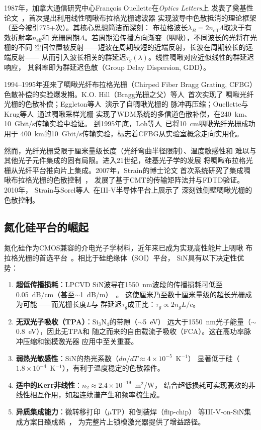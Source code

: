 \documentclass[12pt,a4paper,twoside]{article}
\begin{document}
1987年，加拿大通信研究中心Fran\c{c}ois Ouellette在\textit{Optics Letters}上
发表了奠基性论文~\cite{ouellette1987}，首次提出利用线性啁啾布拉格光栅滤波器
实现波导中色散抵消的理论框架（至今被引775+次）。其核心思想简洁而深刻：
布拉格波长$\lambda_B = 2n_{\text{eff}}\Lambda$取决于有效折射率$n_{\text{eff}}$和
光栅周期$\Lambda$。若周期沿传播方向渐变（啁啾），不同波长的光将在光栅的不同
空间位置被反射——短波在周期较短的近端反射，长波在周期较长的远端反射——
从而引入波长相关的群延迟$\tau_g(\lambda)$。线性啁啾对应近似线性的群延迟响应，
其斜率即为群延迟色散（Group Delay Dispersion, GDD）。

1994--1995年迎来了啁啾光纤布拉格光栅（Chirped Fiber Bragg Grating, CFBG）
色散补偿的实验爆发期。K.O. Hill（Bragg光栅之父）等人~\cite{hill1994}首次实现了
啁啾光纤光栅的色散补偿；Eggleton等人~\cite{eggleton1994}演示了自啁啾光栅的
脉冲再压缩；Ouellette与Krug等人~\cite{ouellette1995}通过啁啾采样光栅
实现了WDM系统的多信道色散补偿，在240~km、10~Gbit/s传输实验中验证。
到1995年底，Loh等人~\cite{loh1995}已将10~cm啁啾光纤光栅成功用于
400~km的10~Gbit/s传输实验，标志着CFBG从实验室概念走向实用化。

然而，光纤光栅受限于厘米量级长度（光纤弯曲半径限制）、温度敏感性和
难以与其他光子元件集成的固有局限。进入21世纪，硅基光子学的发展
将啁啾布拉格光栅从光纤平台推向片上集成。2007年，Strain的博士论文
首次系统研究了集成啁啾布拉格光栅的色散控制~\cite{strain2007}，
发展了基于CMT的传输矩阵法并与FDTD验证。2010年，
Strain与Sorel等人~\cite{strain2010}在III-V半导体平台上展示了
深刻蚀侧壁啁啾光栅的色散控制。

\subsection{氮化硅平台的崛起}

氮化硅作为CMOS兼容的介电光子学材料，近年来已成为实现高性能片上啁啾
布拉格光栅的首选平台~\cite{gardes2022}。相比于硅绝缘体（SOI）平台，
SiN具有以下决定性优势：

\begin{enumerate}[leftmargin=*,itemsep=2pt]
\item \textbf{超低传播损耗}：LPCVD SiN波导在1550~nm波段的传播损耗可低至
  \SI{0.05}{dB/cm}（甚至$\sim$\SI{1}{dB/m}）~\cite{du2020}。
  这使厘米乃至数十厘米量级的超长光栅成为可能——而光栅长度$L$与
  群延迟$\tau_g$成正比：$\tau_g \propto 2n_g L/c$。
\item \textbf{无双光子吸收（TPA）}：Si$_3$N$_4$的带隙（$\sim$\SI{5}{eV}）
  远大于1550~nm光子能量（$\sim$\SI{0.8}{eV}），因此无TPA和
  随之而来的自由载流子吸收（FCA）。这在高功率脉冲压缩和锁模激光器
  应用中至关重要。
\item \textbf{弱热光敏感性}：SiN的热光系数（$dn/dT \approx 4\times10^{-5}$~K$^{-1}$）
  显著低于硅（$1.8\times10^{-4}$~K$^{-1}$），有利于温度稳定的色散器件。
\item \textbf{适中的Kerr非线性}：$n_2 \approx 2.4\times10^{-19}$~m$^2$/W，
  结合超低损耗可实现高效的非线性相互作用，如超连续谱产生和频率梳生成。
\item \textbf{异质集成能力}：微转移打印（$\mu$TP）和倒装焊（flip-chip）
  等III-V-on-SiN集成方案日臻成熟~\cite{cuyvers2021,hermans2021,vissers2021}，
  为完整片上锁模激光器提供了增益路径。
\end{enumerate}
\end{document}
